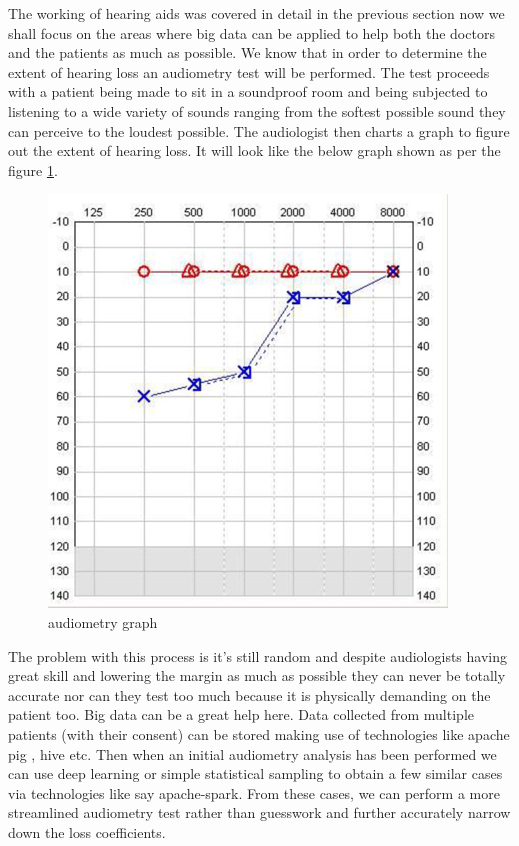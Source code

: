 \documentclass[sigconf]{acmart}
\begin{document}
The working of hearing aids was covered in detail in the previous section now we shall focus on the areas where big data can be applied to help both the doctors and the patients as much as possible. We know that in order to determine the extent of hearing loss an audiometry test will be performed. The test proceeds with a patient being made to sit in a soundproof room and being subjected to listening to a wide variety of sounds ranging from the softest possible sound they can perceive to the loudest possible. The audiologist then charts a graph to figure out the extent of hearing loss. It will look like the below graph shown as per the figure  \ref{f:audiometrygraph}.
\begin{figure}[!ht]
  \centering\includegraphics[width=\columnwidth]{images/Menieres.jpg}
  \caption{audiometry graph}\label{f:audiometrygraph}
\end{figure}  
The problem with this process is it's still random and despite audiologists having great skill and lowering the margin as much as possible they can never be totally accurate nor can they test too much because it is physically demanding on the patient too. Big data can be a great help here. Data collected from multiple patients (with their consent) can be stored making use of technologies like apache pig , hive etc. Then when an initial audiometry analysis has been performed we can use deep learning or simple statistical sampling to obtain a few similar cases via technologies like say apache-spark. From these cases, we can perform a more streamlined audiometry test rather than guesswork and further accurately narrow down the loss coefficients. 
\end{document}
